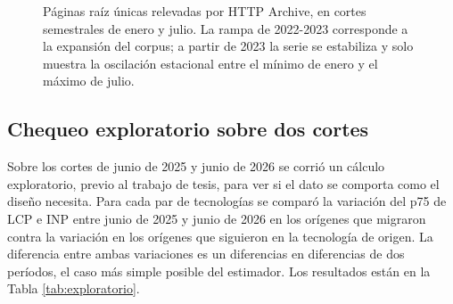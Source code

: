 \documentclass[12pt, a4paper]{article}
\begin{document}
\begin{figure}[htbp]
\centering
{}
\caption{Páginas raíz únicas relevadas por HTTP Archive, en cortes semestrales de enero y julio. La rampa de 2022-2023 corresponde a la expansión del corpus; a partir de 2023 la serie se estabiliza y solo muestra la oscilación estacional entre el mínimo de enero y el máximo de julio.}
\label{fig:panel}
\end{figure}

\subsection{Chequeo exploratorio sobre dos cortes}
\label{sec:exploratorio}

Sobre los cortes de junio de 2025 y junio de 2026 se corrió un cálculo exploratorio, previo al trabajo de tesis, para ver si el dato se comporta como el diseño necesita. Para cada par de tecnologías se comparó la variación del p75 de LCP e INP entre junio de 2025 y junio de 2026 en los orígenes que migraron contra la variación en los orígenes que siguieron en la tecnología de origen. La diferencia entre ambas variaciones es un diferencias en diferencias de dos períodos, el caso más simple posible del estimador. Los resultados están en la Tabla \ref{tab:exploratorio}.
\end{document}
